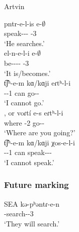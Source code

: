 \begin{exe}
	\ex Artvin\label{sent:Artvin:morpho:verb:impfMore}
	\begin{xlist}
		\ex \gll pntr-e-l-is e-$\emptyset$ \\
		speak-{\thgloss}-{\infgloss}-{\impfcvb} {\aux}-3{\sg} \\
		\trans `He searches.'\\
		\ex \gll el-n-e-l-i e-$\emptyset$ \\
		be-{\vx}-{\thgloss}-{\infgloss}-{\impfcvb} {\aux}-3{\sg} \\
		\trans `It is/becomes.'\\
		\ex \gll t͡ʃʰ-e-m kɑ/kɑji eɾtʰ-l-i \\
		{\neggloss}-{\aux}-1{\sg} can go-{\infgloss}-{\impfcvb} \\
		\trans `I cannot go.'\\ 
		, or 
		\ex \gll voɾt\'i e-s eɾtʰ-l-i \\
		where {\aux}-2{\sg} go-{\infgloss}-{\impfcvb} \\
		\trans `Where are you going?'\\
		\ex \gll t͡ʃʰ-e-m kɑ/kɑji χos-e-l-i \\
		{\neggloss}-{\aux}-1{\sg} can speak-{\thgloss}-{\infgloss}-{\impfcvb} \\
		\trans `I cannot speak.'\\ 
		
	\end{xlist}
\end{exe}

\subsubsection{Future marking}


\begin{exe}
	\ex SEA \label{sent:Artvin:morpho:verb:fut:SEA}
	\gll kə-pʰəntɾ-e-n \\
	{\fut}-search-{\thgloss}-3{\pl} \\
	\trans `They will search.' \\
\end{exe}


